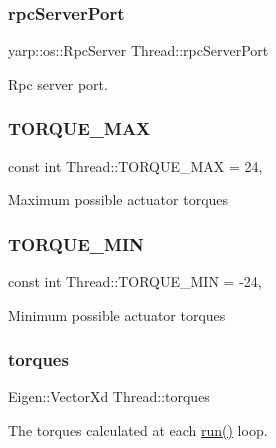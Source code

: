 \subsubsection{\texorpdfstring{rpc\+Server\+Port}{rpcServerPort}}
{\footnotesize\ttfamily yarp\+::os\+::\+Rpc\+Server Thread\+::rpc\+Server\+Port\hspace{0.3cm}{\ttfamily [private]}}

Rpc server port. \hypertarget{classThread_a5e864394c4bd0fbdf3cba7f6f825e17d}{}\label{classThread_a5e864394c4bd0fbdf3cba7f6f825e17d} 
\subsubsection{\texorpdfstring{T\+O\+R\+Q\+U\+E\+\_\+\+M\+AX}{TORQUE\_MAX}}
{\footnotesize\ttfamily const int Thread\+::\+T\+O\+R\+Q\+U\+E\+\_\+\+M\+AX = 24\hspace{0.3cm}{\ttfamily [static]}, {\ttfamily [private]}}

Maximum possible actuator torques \hypertarget{classThread_ad44e5fbda8070c252ea71823a4b9a6db}{}\label{classThread_ad44e5fbda8070c252ea71823a4b9a6db} 
\subsubsection{\texorpdfstring{T\+O\+R\+Q\+U\+E\+\_\+\+M\+IN}{TORQUE\_MIN}}
{\footnotesize\ttfamily const int Thread\+::\+T\+O\+R\+Q\+U\+E\+\_\+\+M\+IN = -\/24\hspace{0.3cm}{\ttfamily [static]}, {\ttfamily [private]}}

Minimum possible actuator torques \hypertarget{classThread_a3238993799b36af06f3858a3f65dcf1e}{}\label{classThread_a3238993799b36af06f3858a3f65dcf1e} 
\subsubsection{\texorpdfstring{torques}{torques}}
{\footnotesize\ttfamily Eigen\+::\+Vector\+Xd Thread\+::torques\hspace{0.3cm}{\ttfamily [private]}}

The torques calculated at each \hyperlink{classThread_ad9373d8d725c46717dfce3130018fe3a}{run()} loop. \hypertarget{classThread_aa3f4bbc2dca15c247a13de1bdbc4f7a3}{}\label{classThread_aa3f4bbc2dca15c247a13de1bdbc4f7a3} 
